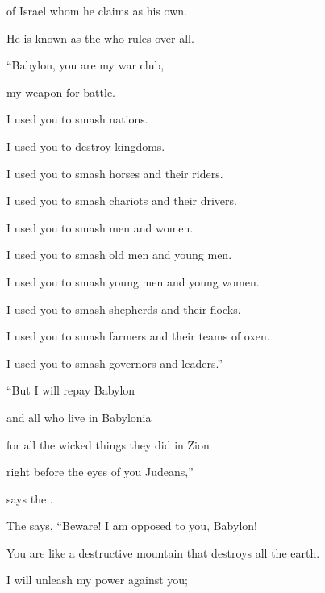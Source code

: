 {of Israel whom he claims as his own.
\par }{\Q He is known
as the
{}
who rules over all.
\par }{\Q {}“Babylon, you
are my war club,
\par }{\Q my weapon
for battle.
\par }{\Q I used you to smash
nations.
\par }{\Q I used you to destroy
kingdoms.
\par }{\Q {}I used you to smash
horses
and their riders.
\par }{\Q I used you to smash
chariots
and their drivers.
\par }{\Q {}I used you to smash
men
and women.
\par }{\Q I used you to smash
old men
and young men.
\par }{\Q I used you to smash
young men
and young women.
\par }{\Q {}I used you to smash
shepherds
and their flocks.
\par }{\Q I used you to smash
farmers
and their teams
of oxen.
\par }{\Q I used you to smash
governors
and leaders.”
\par }{\Q {}“But I will repay
Babylon
\par }{\Q and all
who live
in Babylonia
\par }{\Q for all
the wicked
things they did
in Zion
\par }{\Q right before the eyes
of you Judeans,”

\par }{\Q says
the {}.
\par }{\Q {}The
{}
says, “Beware! I am opposed
to
you, Babylon!

\par }{\Q You are like a destructive
mountain
that destroys
all
the earth.
\par }{\Q I will unleash
my power
against
you;

}
